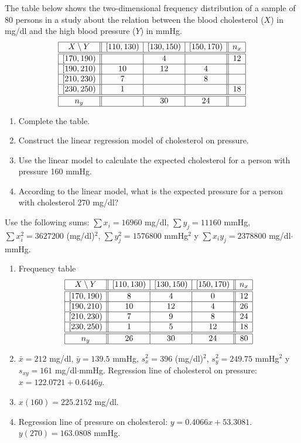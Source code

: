 {The table below shows the two-dimensional frequency distribution of a sample of 80 persons in a study about the
relation between the blood cholesterol ($X$) in mg/dl and the high blood pressure ($Y$) in mmHg.
\[
\begin{array}{|c||c|c|c||c|}
\hline
X\setminus Y & [110,130) & [130,150) & [150,170) & n_x \\
\hline\hline
[170,190)   &           &     4     &           & 12\\
\hline
[190,210)   &    10     &    12     &     4     &   \\
\hline
[210,230)   &     7     &           &     8     &   \\
\hline
[230,250)   &     1     &           &           & 18\\
\hline\hline
n_y          &           &    30     &    24    &    \\
\hline
\end{array}
\]

\begin{enumerate}
\item Complete the table.
\item Construct the linear regression model of cholesterol on pressure.
\item Use the linear model to calculate the expected cholesterol for a person with pressure 160 mmHg.
\item According to the linear model, what is the expected pressure for a person with cholesterol 270 mg/dl?
\end{enumerate}

Use the following sums:
$\sum x_i=16960$ mg/dl, $\sum y_j=11160$ mmHg, $\sum x_i^2=3627200$ (mg/dl)$^2$, $\sum y_j^2=1576800$ mmHg$^2$ y
$\sum x_iy_j=2378800$ mg/dl$\cdot$mmHg.
}
{
\begin{enumerate}
\item Frequency table
\[
\begin{array}{|c||c|c|c||c|}
\hline
X\setminus Y & [110,130) & [130,150) & [150,170) & n_x \\
\hline\hline
[170,190)   &     8     &     4     &     0     & 12 \\
\hline
[190,210)   &    10     &    12     &     4     & 26 \\
\hline
[210,230)   &     7     &     9     &     8     & 24 \\
\hline
[230,250)   &     1     &     5     &    12     & 18 \\
\hline\hline
n_y          &   26     &    30     &    24     & 80 \\
\hline
\end{array}
\]
\item $\bar x=212$ mg/dl, $\bar y=139.5$ mmHg, $s_x^2=396$ (mg/dl)$^2$, $s_y^2=249.75$ mmHg$^2$ y $s_{xy}=161$
mg/dl$\cdot$mmHg. Regression line of cholesterol on pressure: $x=122.0721+0.6446y$.
\item  $x(160)=225.2152$ mg/dl.
\item Regression line of pressure on cholesterol: $y=0.4066x+53.3081$.\\
$y(270)=163.0808$ mmHg.
\end{enumerate}
}
{}


